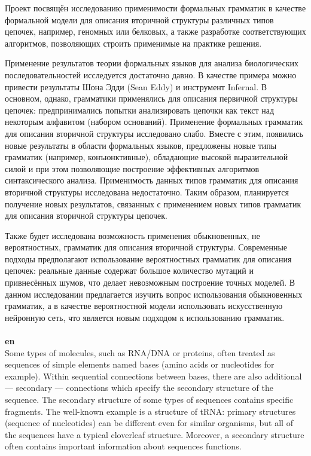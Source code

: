 \documentclass[12pt]{article}  %
\theoremstyle{remark}
\begin{document}
Проект посвящён исследованию применимости формальных грамматик в качестве формальной модели для описания вторичной структуры различных типов цепочек, например, геномных или белковых, а также разработке соответствующих алгоритмов, позволяющих строить применимые на практике решения.

Применение результатов теории формальных языков для анализа биологических последовательностей исследуется достаточно давно.
В качестве примера можно привести результаты Шона Эдди (Sean Eddy) и инструмент Infernal.
В основном, однако, грамматики применялись для описания первичной структуры цепочек: предпринимались попытки анализировать цепочки как текст над некоторым алфавитом (набором оснований).
Применение формальных грамматик для описания вторичной структуры исследовано слабо.
Вместе с этим, появились новые результаты в области формальных языков, предложены новые типы грамматик (например, конъюнктивные), обладающие высокой выразительной силой и при этом позволяющие построение эффективных алгоритмов синтаксического анализа.
Применимость данных типов грамматик для описания вторичной структуры исследована недостаточно.
Таким образом, планируется получение новых результатов, связанных с применением новых типов грамматик для описания вторичной структуры цепочек.

Также будет исследована возможность применения обыкновенных, не вероятностных, грамматик для описания вторичной структуры.
Современные подходы предполагают использование вероятностных грамматик для описания цепочек: реальные данные содержат большое количество мутаций и привнесённых шумов, что делает невозможным построение точных моделей.
В данном исследовании предлагается изучить вопрос использования обыкновенных грамматик, а в качестве вероятностной модели использовать искусственную нейронную сеть, что является новым подходом к использованию грамматик.
\\
\\
\textbf{en}\\
Some types of molecules, such as RNA/DNA or proteins, often treated as sequences of simple elements named bases (amino acids or nucleotides for example).
Within sequential connections between bases, there are also additional --- secondary --- connections which specify the secondary structure of the sequence.
The secondary structure of some types of sequences contains specific fragments.
The well-known example is a structure of tRNA: primary structures (sequence of nucleotides) can be different even for similar organisms, but all of the sequences have a typical cloverleaf structure. Moreover, a secondary structure often contains important information about sequences functions.
\end{document}
